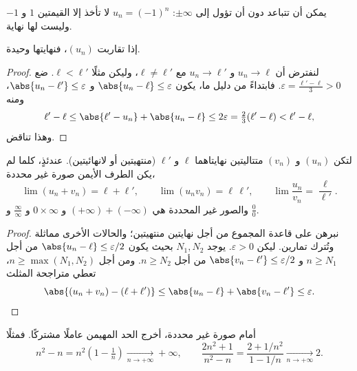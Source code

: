 \begin{remark}
يمكن أن تتباعد  دون أن تؤول إلى $\pm\infty$: 
$u_n = (-1)^n$ لا تأخذ إلا القيمتين $1$ و $-1$ وليست لها نهاية.
\end{remark}

\begin{proposition}\label{prop:g12:seq:uniqueness}
إذا تقاربت $(u_n)$، فنهايتها وحيدة.
\end{proposition}

\begin{proof}
لنفترض أن $u_n \to \ell$ و $u_n \to \ell'$ مع $\ell \neq \ell'$، وليكن مثلًا
$\ell < \ell'$. ضع $\varepsilon = \frac{\ell' - \ell}{3} > 0$. فابتداءً من
دليل ما، يكون $\abs{u_n - \ell} \leq \varepsilon$ و
$\abs{u_n - \ell'} \leq \varepsilon$، ومنه
\[
\ell' - \ell \leq \abs{\ell' - u_n} + \abs{u_n - \ell}
\leq 2\varepsilon = \tfrac{2}{3}(\ell' - \ell) < \ell' - \ell,
\]
وهذا تناقض.
\end{proof}

\begin{proposition}\label{prop:g12:seq:operations}
لتكن $(u_n)$ و $(v_n)$ متتاليتين نهايتاهما $\ell$ و $\ell'$ (منتهيتين أو
لانهائيتين). عندئذٍ، كلما لم يكن الطرف الأيمن صورة غير محددة،
\[
\lim (u_n + v_n) = \ell + \ell', \qquad
\lim (u_n v_n) = \ell\,\ell', \qquad
\lim \frac{u_n}{v_n} = \frac{\ell}{\ell'}.
\]
والصور غير المحددة هي
$(+\infty) + (-\infty)$ و $0 \times \infty$ و $\frac{\infty}{\infty}$ و
$\frac{0}{0}$.
\end{proposition}

\begin{proof}
نبرهن على قاعدة المجموع من أجل نهايتين منتهيتين؛ والحالات الأخرى مماثلة وتُترك
تمارين. ليكن $\varepsilon > 0$. يوجد $N_1, N_2$ بحيث
يكون $\abs{u_n - \ell} \leq \varepsilon/2$ من أجل $n \geq N_1$ و
$\abs{v_n - \ell'} \leq \varepsilon/2$ من أجل $n \geq N_2$. ومن أجل
$n \geq \max(N_1, N_2)$، تعطي متراجحة المثلث
\[
\abs{(u_n + v_n) - (\ell + \ell')}
\leq \abs{u_n - \ell} + \abs{v_n - \ell'} \leq \varepsilon. \qedhere
\]
\end{proof}

\begin{method}\label{met:g12:seq:indeterminate}
أمام صورة غير محددة، أخرج الحد المهيمن عاملًا مشتركًا. فمثلًا
\[
n^2 - n = n^2\left(1 - \tfrac{1}{n}\right) \xrightarrow[n\to+\infty]{} +\infty,
\qquad
\frac{2n^2+1}{n^2 - n} = \frac{2 + 1/n^2}{1 - 1/n}
\xrightarrow[n\to+\infty]{} 2 .
\]
\end{method}

